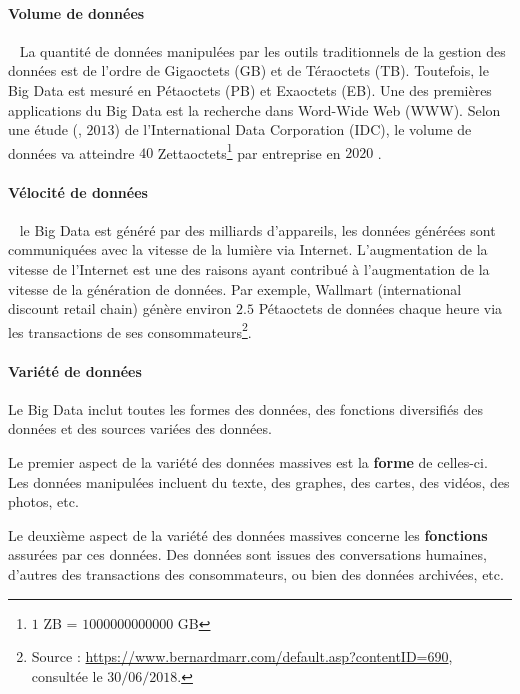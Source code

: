 		\paragraph{Volume de données}~
		La quantité de données manipulées par les outils traditionnels de la gestion des données est de l'ordre de Gigaoctets (GB) et de Téraoctets (TB). Toutefois, le Big Data est mesuré en Pétaoctets (PB) et Exaoctets (EB). Une des premières applications du Big Data est la recherche dans Word-Wide Web (WWW). Selon une étude (\cite{6567202}, $2013$) de l'International Data Corporation (IDC), le volume de données  va atteindre $40$ Zettaoctets\footnote{ $ 1$ ZB = $1000000000000$ GB } par  entreprise en $2020$ .
		
		\paragraph{Vélocité de données} ~
		le Big Data est généré par des milliards
		d'appareils, les données générées sont communiquées avec la vitesse de la lumière via Internet. L'augmentation de la vitesse de l'Internet est une  des raisons ayant contribué à l'augmentation de la vitesse de la génération de données.	
		Par exemple, Wallmart (international discount retail chain) génère environ   $2.5$ Pétaoctets de données chaque  heure via les transactions de ses consommateurs\footnote{Source : \url{https://www.bernardmarr.com/default.asp?contentID=690}, consultée le $ 30/06/2018 $.}.
		
		
		
		
		
		\paragraph{Variété de données} \label{variete-data}
		
		Le Big Data inclut toutes les formes des données, des fonctions diversifiés des données et des sources variées des données.
		
		Le premier aspect de la variété  des données massives est la \textbf{forme} de celles-ci. Les données manipulées incluent du texte, des graphes, des cartes, des vidéos, des photos, etc.
		
		Le deuxième aspect de la variété des données massives concerne les \textbf{fonctions} assurées par ces données. Des données sont issues des conversations humaines, d'autres des transactions des consommateurs, ou bien des données archivées, etc.
		
